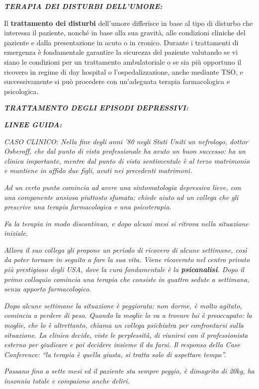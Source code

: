 \documentclass[]{article}
\date{}
\begin{document}
\textbf{\emph{TERAPIA DEI DISTURBI DELL'UMORE:}}

Il \textbf{trattamento dei disturbi} dell'umore differisce in base al
tipo di disturbo che interessa il paziente, nonché in base alla sua
gravità, alle condizioni cliniche del paziente e dalla presentazione in
acuto o in cronico. Durante i trattamenti di emergenza è fondamentale
garantire la sicurezza del paziente valutando se vi siano le condizioni
per un trattamento ambulatoriale o se sia più opportuno il ricovero in
regime di day hospital o l'ospedalizzazione, anche mediante TSO, e
successivamente si può procedere con un'adeguata terapia farmacologica e
psicologica.

\textbf{\emph{TRATTAMENTO DEGLI EPISODI DEPRESSIVI:}}

\textbf{\emph{LINEE GUIDA:}}

\emph{\emph{CASO CLINICO: Nella fine degli anni '80 negli Stati Uniti un
nefrologo, dottor Osheroff, che dal punto di vista professionale ha
avuto un buon successo: ha un clinica importante, mentre dal punto di
vista sentimentale è al terzo matrimonio e mantiene in affido due figli,
avuti nei precedenti matrimoni.}}

\emph{Ad un certo punto comincia ad avere una sintomatologia depressiva
lieve, con una componente ansiosa piuttosto sfumata: chiede aiuto ad un
collega che gli prescrive una terapia farmacologica e una psicoterapia.
}

\emph{Fa la terapia in modo discontinuo, e dopo alcuni mesi si ritrova
nella situazione iniziale.}

\emph{Allora il suo collega gli propone un periodo di ricovero di alcune
settimane, così da poter tornare in seguito a fare la sua vita. Viene
ricoverato nel centro privato più prestigioso degli USA, dove la cura
fondamentale è la \textbf{psicanalisi}. Dopo il primo colloquio comincia
una terapia che consiste in quattro sedute a settimana, senza apporto
farmacologico.}

\emph{Dopo alcune settimane la situazione è peggiorata: non dorme, è
molto agitato, comincia a perdere di peso. Quando la moglie lo va a
trovare lui è preoccupato: la moglie, che lo è altrettanto, chiama un
collega psichiatra per confrontarsi sulla situazione. La clinica decide,
viste le perplessità, di riunirsi con il professionista esterno per
giudicare e poi decidere insieme il da farsi. Il responso della Case
Conference: ``la terapia è quella giusta, si tratta solo di aspettare
tempo''.}

\emph{Passano fino a sette mesi ed il paziente sta sempre peggio, è
dimagrito di 20kg, ha insonnia totale e compaiono anche deliri.}
\end{document}
